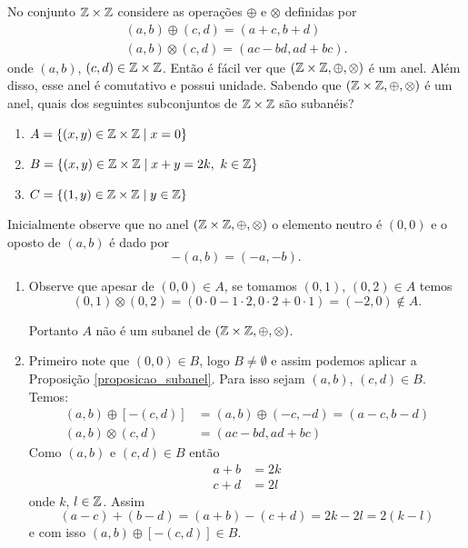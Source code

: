 \begin{exemplo}
    No conjunto $\mathbb{Z} \times \mathbb{Z}$ considere as operações $\oplus$ e $\otimes$ definidas por
    \begin{align*}
        (a, b) \oplus (c, d) = (a + c, b + d)\\
        (a ,b) \otimes (c, d) = (ac - bd, ad + bc).
    \end{align*}
    onde $(a, b)$, $(c, d) \in \mathbb{Z} \times \mathbb{Z}$. Então é fácil ver que $(\mathbb{Z} \times \mathbb{Z}, \oplus, \otimes)$ é um anel. Além disso, esse anel é comutativo e possui unidade. Sabendo que
    $(\mathbb{Z} \times \mathbb{Z}, \oplus, \otimes)$ é um anel, quais dos seguintes subconjuntos de $\mathbb{Z} \times \mathbb{Z}$ são subanéis?
    \begin{enumerate}[label={\alph*})]
        \item $A = \{(x, y) \in \mathbb{Z} \times \mathbb{Z} \mid x = 0\}$

        \item $B = \{(x, y) \in \mathbb{Z} \times \mathbb{Z} \mid x + y = 2k,\ k \in \mathbb{Z}\}$

        \item $C =  \{(1, y) \in \mathbb{Z} \times \mathbb{Z} \mid y \in \mathbb{Z}\}$
    \end{enumerate}
    \begin{solucao}
        Inicialmente observe que no anel $(\mathbb{Z} \times \mathbb{Z}, \oplus, \otimes)$ o elemento neutro é $(0,0)$ e o oposto de $(a, b)$ é dado por
        \[
            -(a, b) = (-a, -b).
        \]
        \begin{enumerate}[label={\alph*})]
            \item Observe que apesar de $(0, 0) \in A$, se tomamos $(0, 1)$, $(0, 2) \in A$ temos
                \[
                    (0, 1) \otimes (0, 2) = (0\cdot 0 - 1\cdot 2, 0\cdot 2 + 0\cdot 1) = (-2, 0) \notin A.
                \]

                Portanto $A$ não é um subanel de $(\mathbb{Z} \times \mathbb{Z}, \oplus, \otimes)$.

            \item Primeiro note que $(0, 0) \in B$, logo $B \ne \emptyset$ e assim podemos aplicar a Proposição \ref{proposicao_subanel}. Para isso sejam $(a, b)$, $(c, d) \in B$.
                Temos:
                \begin{align*}
                    (a, b) \oplus [-(c, d)] &= (a, b) \oplus (-c, -d) = (a - c, b - d)\\
                    (a, b) \otimes (c, d) &= (ac - bd, ad + bc)
                \end{align*}
                Como $(a, b)$ e $(c, d) \in B$ então
                \begin{align}
                    a + b &= 2k\label{primeira_condicao}\\
                    c + d &= 2l\label{segunda_condicao}
                \end{align}
                onde $k$, $l \in \mathbb{Z}$. Assim
                \[
                    (a - c) + (b - d) = (a + b) - (c + d) = 2k - 2l = 2(k - l)
                \]
                e com isso $(a, b) \oplus [-(c, d)] \in B$.


\end{enumerate}
\end{solucao}
\end{exemplo}
